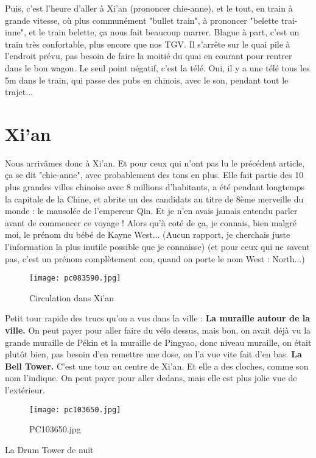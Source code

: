 \documentclass{book}
\begin{document}
Puis, c'est l'heure d'aller à Xi'an (prononcer chie-anne), et le tout, en train à grande vitesse, où plus communément "bullet train", à prononcer "belette trai-inne", et le train belette, ça nous fait beaucoup marrer. Blague à part, c'est un train très confortable, plus encore que nos TGV. Il s'arrête sur le quai pile à l'endroit prévu, pas besoin de faire la moitié du quai en courant pour rentrer dans le bon wagon. Le seul point négatif, c'est la télé. Oui, il y a une télé tous les 5m dans le train, qui passe des pubs en chinois, avec le son, pendant tout le trajet...



\chapter{Xi'an}
Nous arrivâmes donc à Xi'an. Et pour ceux qui n'ont pas lu le précédent article, ça se dit "chie-anne", avec probablement des tons en plus. Elle fait partie des 10 plus grandes villes chinoise avec 8 millions d'habitants, a été pendant longtemps la capitale de la Chine, et abrite un des candidats au titre de 8ème merveille du monde : le mausolée de l'empereur Qin. Et je n'en avais jamais entendu parler avant de commencer ce voyage ! Alors qu'à coté de ça, je connais, bien malgré moi, le prénom du bébé de Kayne West... (Aucun rapport, je cherchais juste l'information la plus inutile possible que je connaisse) (et pour ceux qui ne savent pas, c'est un prénom complètement con, quand on porte le nom West : North...)


\begin{figure}[h]
\centering
\texttt{[image: pc083590.jpg]}
\caption*{Circulation dans Xi'an}
\end{figure}

 Petit tour rapide des trucs qu'on a vus dans la ville :
\textbf{La muraille autour de la ville.} On peut payer pour aller faire du vélo dessus, mais bon, on avait déjà vu la grande muraille de Pékin et la muraille de Pingyao, donc niveau muraille, on était plutôt bien, pas besoin d'en remettre une dose, on l'a vue vite fait d'en bas.
\textbf{ La Bell Tower.} C'est une tour au centre de Xi'an. Et elle a des cloches, comme son nom l'indique. On peut payer pour aller dedans, mais elle est plus jolie vue de l'extérieur.


\begin{figure}[h]
\centering
\texttt{[image: pc103650.jpg]}
\caption*{PC103650.jpg}
\end{figure}La Drum Tower de nuit
\end{document}
